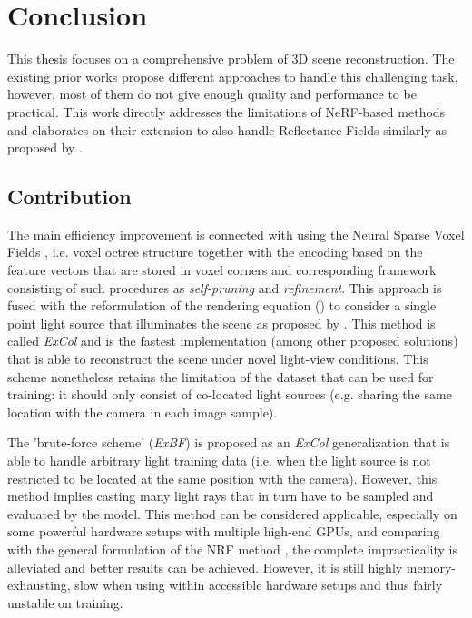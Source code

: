 \chapter{Conclusion}
\label{chap:conclusion}

This thesis focuses on a comprehensive problem of 3D scene reconstruction.
The existing prior works propose different approaches to handle this challenging task,
however, most of them do not give enough quality and performance to be practical.
This work directly addresses the limitations of NeRF-based \cite{mildenhall2020nerf} methods
and elaborates on their extension to also handle Reflectance Fields similarly as proposed by \cite{bi2020neural}.


\section{Contribution}

The main efficiency improvement is connected with using the Neural Sparse Voxel Fields \cite{liu2021neural},
i.e. voxel octree structure together with the encoding
based on the feature vectors that are stored in voxel corners
and corresponding framework consisting of such procedures as \textit{self-pruning} and \textit{refinement}.
This approach is fused with the reformulation of the rendering equation ()
to consider a single point light source that illuminates the scene as proposed by \cite{bi2020neural}.
This method is called \textit{ExCol} and is the fastest implementation
(among other proposed solutions) that is able to reconstruct the scene under novel light-view conditions.
This scheme nonetheless retains the limitation of the dataset that can be used for training:
it should only consist of co-located light sources
(e.g. sharing the same location with the camera in each image sample).

The 'brute-force scheme' (\textit{ExBF}) is proposed as an \textit{ExCol} generalization
that is able to handle arbitrary light training data
(i.e. when the light source is not restricted to be located at the same position with the camera).
However, this method implies casting many light rays that in turn have to be sampled and evaluated by the model.
This method can be considered applicable, especially on some powerful hardware setups with multiple high-end GPUs,
and comparing with the general formulation of the NRF method \cite{bi2020neural},
the complete impracticality is alleviated and better results can be achieved.
However, it is still highly memory-exhausting, slow when using within accessible hardware setups and thus fairly unstable on training.

